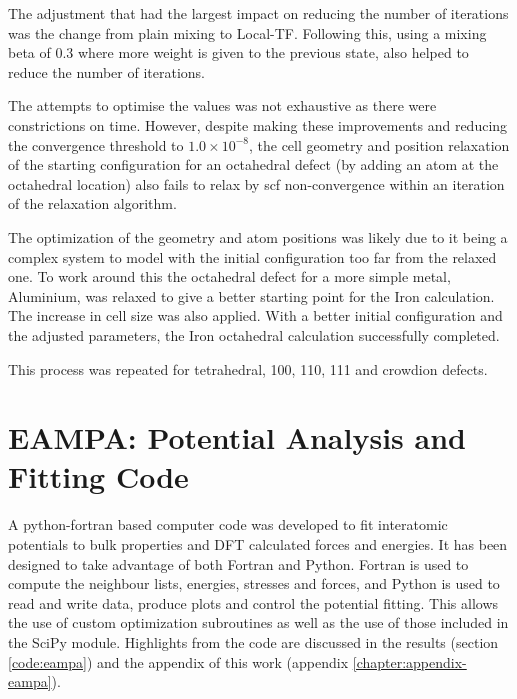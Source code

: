 The adjustment that had the largest impact on reducing the number of iterations was the change from plain mixing to Local-TF.  Following this, using a mixing beta of 0.3 where more weight is given to the previous state, also helped to reduce the number of iterations.

The attempts to optimise the values was not exhaustive as there were constrictions on time.  However, despite making these improvements and reducing the convergence threshold to $1.0 \times 10^{-8}$, the cell geometry and position relaxation of the starting configuration for an octahedral defect (by adding an atom at the octahedral location) also fails to relax by \acrshort{scf} non-convergence within an iteration of the relaxation algorithm. 

The optimization of the geometry and atom positions was likely due to it being a complex system to model with the initial configuration too far from the relaxed one.  To work around this the octahedral defect for a more simple metal, Aluminium, was relaxed to give a better starting point for the Iron calculation.  The increase in cell size was also applied.  With a better initial configuration and the adjusted parameters, the Iron octahedral calculation successfully completed.

This process was repeated for tetrahedral, 100, 110, 111 and crowdion defects.








\section[EAMPA]{EAMPA: Potential Analysis and Fitting Code}

A python-fortran based computer code was developed to fit interatomic potentials to bulk properties and DFT calculated forces and energies.  It has been designed to take advantage of both Fortran and Python.  Fortran is used to compute the neighbour lists, energies, stresses and forces, and Python is used to read and write data, produce plots and control the potential fitting.  This allows the use of custom optimization subroutines as well as the use of those included in the SciPy module.  Highlights from the code are discussed in the results (section \ref{code:eampa}) and the appendix of this work (appendix \ref{chapter:appendix-eampa}).





